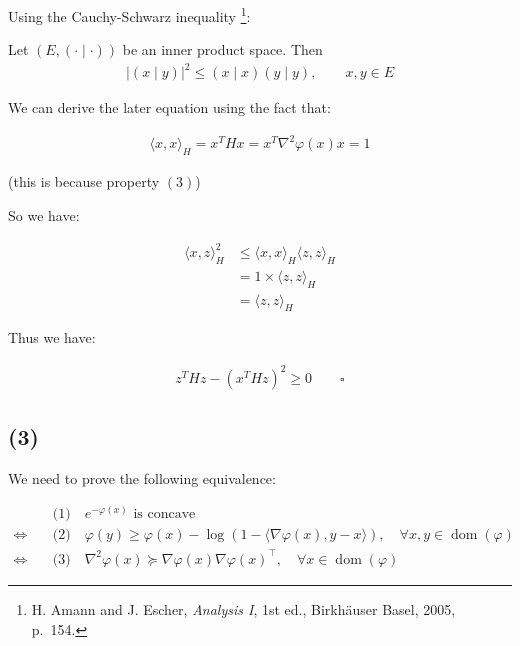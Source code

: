 \documentclass{article}
\begin{document}
Using the Cauchy-Schwarz inequality
\footnote{H. Amann and J. Escher, \textit{Analysis I}, 1st ed., Birkhäuser Basel, 2005, p.~154.}:
\bigskip

\begin{tcolorbox}[greenbox, title = Cauchy-Schwarz inequality]
    Let $(E, (\cdot \mid \cdot))$ be an inner product space. Then  
    \begin{align*}
        |(x \mid y)|^2 \leq (x \mid x)(y \mid y), \qquad x,y \in E
    \end{align*}
\end{tcolorbox}

We can derive the later equation using the fact that:

\begin{align*}
    \langle x, x \rangle_H = x^T H x = x^T \nabla^2 \varphi ( x ) x = 1
\end{align*}

(this is because property $(3)$)

So we have:

\begin{align*}
    \langle x, z \rangle_H^2 
    &\leq \langle x, x \rangle_H \langle z, z \rangle_H \\
    &= 1 \times \langle z, z \rangle_H \\
    &= \langle z, z \rangle_H
\end{align*}

Thus we have:

\begin{align*}
    z^T H z - (x^T H z)^2 \geq 0 \qquad \square
\end{align*}

\subsection*{(3)}

We need to prove the following equivalence:

\begin{align*}
    & \text{(1)} \quad e^{-\varphi(x)} \text{ is concave} \\
    \iff \quad & \text{(2)} \quad \varphi(y) \geq \varphi(x) - \log(1 - \langle \nabla \varphi(x), y - x \rangle), \quad \forall x, y \in \operatorname{dom}(\varphi) \\
    \iff \quad & \text{(3)} \quad \nabla^2 \varphi(x) \succeq \nabla \varphi(x) \nabla \varphi(x)^\top, \quad \forall x \in \operatorname{dom}(\varphi)
\end{align*}
\end{document}
